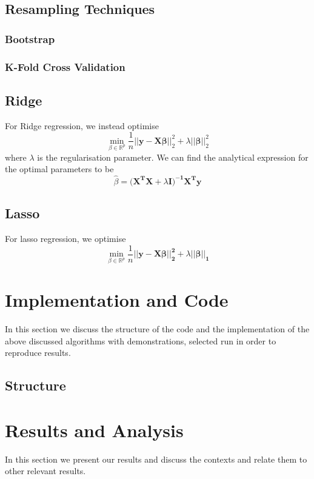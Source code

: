 \documentclass[sigconf, nonacm]{acmart}
\begin{document}
\subsection{Resampling Techniques}
\subsubsection{Bootstrap}%
\label{ssub:Bootstrap}

\subsubsection{K-Fold Cross Validation}%
\label{ssub:K-Fold Cross Validation}

\subsection{Ridge}
For Ridge regression, we instead optimise
\[ \min_{\beta \in \mathbb{R}^{p}} \frac{1}{n} \left | \left|\boldsymbol{y-X\beta} \right | \right |_2^{2} + \lambda \left ||\boldsymbol{\beta}\right||_2^2  \] 
where $ \lambda $ is the regularisation parameter.
We can find the analytical expression for the optimal parameters to be
\[ \hat \beta = \boldsymbol{(X^{T}X} + \lambda \boldsymbol{I)^{-1} X^{T} y}  \] 

\subsection{Lasso}
For lasso regression, we optimise
\[ \min_{\beta \in \mathbb{R}^{p}} \frac{1}{n} \boldsymbol{||y-X\beta||_2^2 + } \lambda||\boldsymbol{\beta||_1} \] 

\section{Implementation and Code}
In this section we discuss the structure of the code and the implementation of the above discussed algorithms with demonstrations, selected run in order to reproduce results.
\subsection{Structure}

\section{Results and Analysis}
In this section we present our results and discuss the contexts and relate them to other relevant results.
\end{document}
